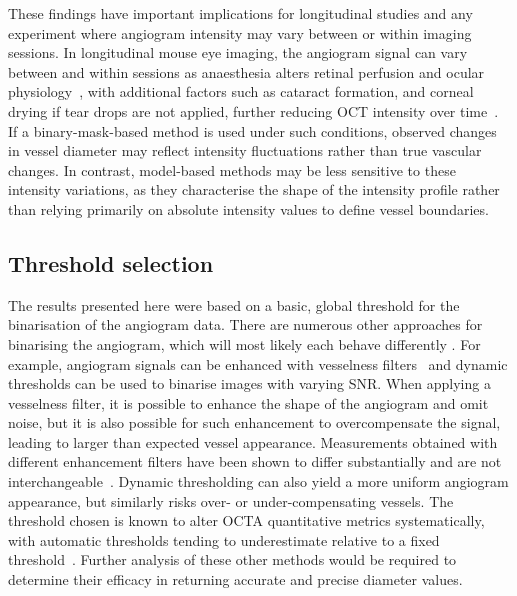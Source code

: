 \documentclass{optica-article}
\begin{document}
These findings have important implications for longitudinal studies and any experiment where angiogram intensity may vary between or within imaging sessions. In longitudinal mouse eye imaging, the angiogram signal can vary between and within sessions as anaesthesia alters retinal perfusion and ocular physiology~\cite{wormRetinalOCTParameters2026,fengHighresolutionStructuralFunctional2023}, with additional factors such as cataract formation, and corneal drying if tear drops are not applied, further reducing OCT intensity over time~\cite{steinEffectCornealDrying2006,mclellanOpticalCoherenceTomography2012}. If a binary-mask-based method is used under such conditions, observed changes in vessel diameter may reflect intensity fluctuations rather than true vascular changes. In contrast, model-based methods may be less sensitive to these intensity variations, as they characterise the shape of the intensity profile rather than relying primarily on absolute intensity values to define vessel boundaries.

\subsection{Threshold selection}
\label{subsec:threshold_selection}
The results presented here were based on a basic, global threshold for the binarisation of the angiogram data. There are numerous other approaches for binarising the angiogram, which will most likely each behave differently \cite{mehtaImpactBinarizationThresholding2019,rabioloComparisonMethodsQuantify2018,borrelliOPTICALCOHERENCETOMOGRAPHY2021,freedmanImpactImageProcessing2022,arrigoImpactDifferentThresholds2021}. For example, angiogram signals can be enhanced with vesselness filters~\cite{frangiMultiscaleVesselEnhancement1998} and dynamic thresholds can be used to binarise images with varying SNR. When applying a vesselness filter, it is possible to enhance the shape of the angiogram and omit noise, but it is also possible for such enhancement to overcompensate the signal, leading to larger than expected vessel appearance. Measurements obtained with different enhancement filters have been shown to differ substantially and are not interchangeable~\cite{hongEffectVesselEnhancement2020}. Dynamic thresholding can also yield a more uniform angiogram appearance, but similarly risks over- or under-compensating vessels. The threshold chosen is known to alter OCTA quantitative metrics systematically, with automatic thresholds tending to underestimate relative to a fixed threshold~\cite{mehtaImpactBinarizationThresholding2019,arrigoImpactDifferentThresholds2021}. Further analysis of these other methods would be required to determine their efficacy in returning accurate and precise diameter values.
\end{document}
